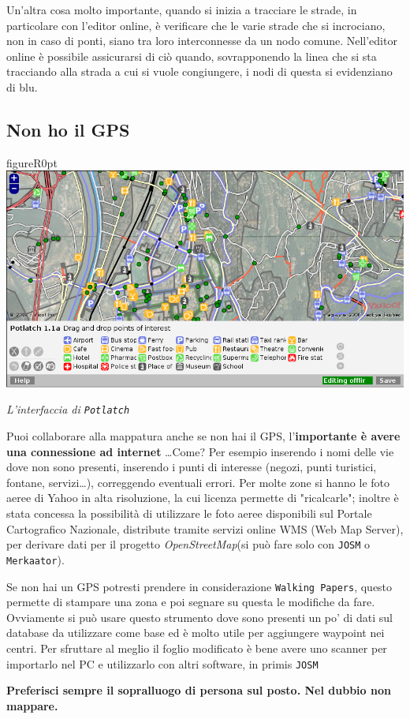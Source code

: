 \documentclass[a4paper,twoside,12pt,]{article}
\newcommand{\osm}{\emph{OpenStreetMap}\xspace}
\newcommand{\gps}{GPS\xspace}
\newcommand{\soft}[1]{\texttt{#1}}
\begin{document}
Un'altra cosa molto importante, quando si inizia a tracciare le strade, in particolare con l'editor online, è verificare che le varie strade che si incrociano, non in caso di ponti, siano tra loro interconnesse da un nodo comune. Nell'editor online è possibile assicurarsi di ciò quando, sovrapponendo la linea che si sta tracciando alla strada a cui si vuole congiungere, i nodi di questa si evidenziano di blu.
\subsection{Non ho il \gps}
\begin{wrapfloat}{figure}{R}{0pt}
 \includegraphics[width=0.7\columnwidth]{potlatch.png}
 \caption{\textit{L'interfaccia di \soft{Potlatch}}}
\end{wrapfloat}
Puoi collaborare alla mappatura anche se non hai il \gps, l'\textbf{importante è avere una connessione ad internet} \dots Come? Per esempio inserendo i nomi delle vie dove non sono presenti, inserendo i punti di interesse (negozi, punti turistici, fontane, servizi\dots), correggendo eventuali errori. Per molte zone si hanno le foto aeree di Yahoo in alta risoluzione, la cui licenza permette di "ricalcarle"; inoltre è stata concessa la possibilità di utilizzare le foto aeree disponibili sul Portale Cartografico Nazionale, distribute tramite servizi online WMS (Web Map Server), per derivare dati per il progetto \osm (si può fare solo con \soft{JOSM} o \soft{Merkaator}). 

Se non hai un \gps potresti prendere in considerazione \soft{Walking Papers}, questo permette di stampare una zona e poi segnare su questa le modifiche da fare. Ovviamente si può usare questo strumento dove sono presenti un po' di dati sul database da utilizzare come base ed è molto utile per aggiungere waypoint nei centri. Per sfruttare al meglio il foglio modificato è bene avere uno scanner per importarlo nel PC e utilizzarlo con altri software, in primis \soft{JOSM}

\textbf{Preferisci sempre il sopralluogo di persona sul posto. Nel dubbio non mappare.}
\end{document}
